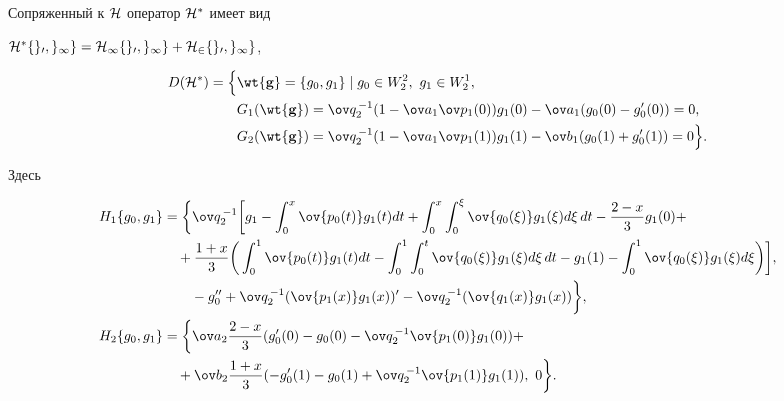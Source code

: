 \begin{thm} 


Сопряженный к $\cal H$ оператор $\cal H^*$ имеет вид 


$\cal H^*\{g_0,g_1\}=H_1\{g_0,g_1\}+H_2\{g_0,g_1\}$, 


\begin{align*} 


D(\cal H^*)&=\Big\{\wt{\bold g}=\{g_0,g_1\}\mid g_0\in W^2_2, 


\ g_1\in W^1_2,\\ 


% 


&\qquad G_1(\wt{\bold g})=\ov q_2^{\,-1}(1-\ov a_1 


\ov p_1(0))g_1(0)-\ov a_1(g_0(0)-g'_0(0))=0,\\ 


% 


&\qquad G_2(\wt{\bold g})=\ov q_2^{\,-1}(1-\ov a_1 


\ov p_1(1))g_1(1)-\ov b_1(g_0(1)+g'_0(1))=0\Big\}. 


\end{align*} 


Здесь  


\begin{align*} 


H_1\{g_0,g_1\}&=\bigg\{\ov q_2^{\,-1}\bigg[g_1- 


\int^x_0\ov{p_0(t)}g_1(t)dt+\int^x_0\int^\xi_0\ov{q_0(\xi)} 


g_1(\xi)d\xi\,dt-\frac{2-x}{3}g_1(0)+\\ 


% 


&\quad+\frac{1+x}{3}\bigg(\int^1_0\ov{p_0(t)}g_1(t)dt- 


\int^1_0\int^t_0\ov{q_0(\xi)}g_1(\xi)d\xi\,dt- 


g_1(1)-\int^1_0\ov{q_0(\xi)}g_1(\xi)d\xi\bigg)\bigg], \\ 


% 


&\qquad -g''_0+\ov q_2^{\,-1}(\ov{p_1(x)}g_1(x))'- 


\ov q_2^{\,-1}(\ov{q_1(x)}g_1(x))\bigg\}, \\ 


% 


H_2\{g_0,g_1\}&=\bigg\{\ov a_2\frac{2-x}{3}(g'_0(0)-g_0(0)- 


\ov q_2^{\,-1}\ov{p_1(0)}g_1(0)) +\\ 


&\quad +\ov b_2\frac{1+x}{3}(-g'_0(1)-g_0(1)+ 


\ov q_2^{\,-1}\ov{p_1(1)}g_1(1)),\ 0\bigg\}. 


\end{align*} 


\end{thm} 



